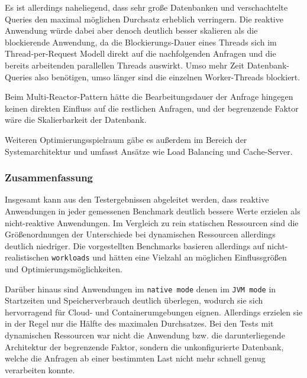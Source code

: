 Es ist allerdings naheliegend, dass sehr große Datenbanken und verschachtelte Queries den maximal möglichen Durchsatz erheblich verringern.
Die reaktive Anwendung würde dabei aber denoch deutlich besser skalieren als die blockierende Anwendung, da die Blockierungs-Dauer
eines Threads sich im Thread-per-Request Modell direkt auf die nachfolgenden Anfragen und die bereits arbeitenden parallellen Threads
auswirkt. Umso mehr Zeit Datenbank-Queries also benötigen, umso länger sind die einzelnen Worker-Threads blockiert.

Beim Multi-Reactor-Pattern hätte die Bearbeitungsdauer der Anfrage hingegen keinen direkten Einfluss auf die restlichen Anfragen, und der
begrenzende Faktor wäre die Skalierbarkeit der Datenbank.

Weiteren Optimierungsspielraum gäbe es außerdem im Bereich der Systemarchitektur und umfasst Ansätze wie Load Balancing und Cache-Server.
\subsubsection{Zusammenfassung}
\label{subsubsec:auswertung_zusammenfassung}
Insgesamt kann aus den Testergebnissen abgeleitet werden, dass reaktive Anwendungen in jeder gemessenen
Benchmark deutlich bessere Werte erzielen als nicht-reaktive Anwendungen.
Im Vergleich zu rein statischen Ressourcen
sind die Größenordnungen der Unterschiede bei dynamischen Ressourcen allerdings deutlich niedriger.
Die vorgestellten Benchmarks basieren allerdings auf nicht-realistischen \verb|workloads| und hätten eine Vielzahl an möglichen
Einflussgrößen und Optimierungsmöglichkeiten.

Darüber hinaus sind Anwendungen im \verb|native mode| denen im \verb|JVM mode| in Startzeiten und Speicherverbrauch deutlich überlegen,
wodurch sie sich hervorragend für Cloud- und Containerumgebungen eignen. Allerdings erzielen sie in der Regel nur die Hälfte des maximalen Durchsatzes.
Bei den Tests mit dynamischen Ressourcen war nicht die Anwendung bzw. die darunterliegende Architektur der begrenzende Faktor,
sondern die unkonfigurierte Datenbank, welche die Anfragen ab einer bestimmten Last nicht mehr schnell genug verarbeiten konnte.

